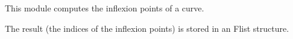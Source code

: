 This module computes the inflexion points  of a curve.

\medskip
The result (the indices of the inflexion points) is stored in an 
Flist structure.